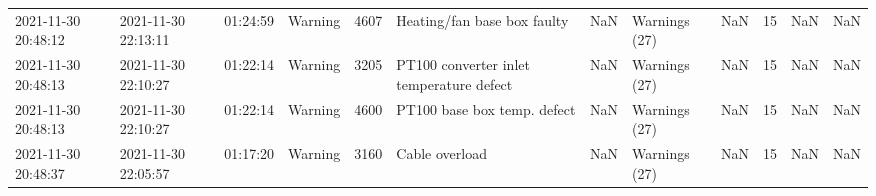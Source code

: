 \begin{tabular}{llllrllllrlr}
2021-11-30 20:48:12 & 2021-11-30 22:13:11 & 01:24:59 & Warning & 4607 & Heating/fan base box faulty & NaN & Warnings (27) & NaN & 15 & NaN & NaN \\
2021-11-30 20:48:13 & 2021-11-30 22:10:27 & 01:22:14 & Warning & 3205 & PT100 converter inlet temperature defect & NaN & Warnings (27) & NaN & 15 & NaN & NaN \\
2021-11-30 20:48:13 & 2021-11-30 22:10:27 & 01:22:14 & Warning & 4600 & PT100 base box temp. defect & NaN & Warnings (27) & NaN & 15 & NaN & NaN \\
2021-11-30 20:48:37 & 2021-11-30 22:05:57 & 01:17:20 & Warning & 3160 & Cable overload & NaN & Warnings (27) & NaN & 15 & NaN & NaN \\
\bottomrule
\end{tabular}
